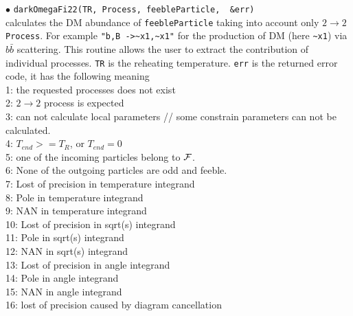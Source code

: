 \documentclass[12pt,a4paper]{article}
\begin{document}
\noindent
$\bullet$ \verb|darkOmegaFi22(TR, Process, feebleParticle,  &err)|  \\
calculates the  DM abundance of {\tt feebleParticle}  taking into account only  $2\to2$ {\tt Process}. For example \verb|"b,B ->~x1,~x1"|  for the production of DM (here \verb|~x1|) via $b\bar{b}$ scattering. This routine allows the user to extract the contribution of individual processes. \verb|TR| is the  reheating temperature. 
{\tt err} is the  returned error code, it has the following meaning\\
1: the requested processes does not exist\\
2: $2\rightarrow 2$ process is expected\\
3: can not calculate local parameters  // some constrain parameters can not be calculated.\\
4: $T_{end}>=T_R$, or $T_{end}=0$ \\
5: one of the incoming particles belong to ${\cal F}$.\\
6: None of the outgoing particles are odd  and feeble.\\
 7: Lost of precision in  temperature integrand\\
 8: Pole in temperature integrand\\
 9: NAN in temperature integrand\\
10: Lost of precision in  sqrt(s) integrand\\
11: Pole in sqrt(s) integrand\\
12: NAN  in sqrt(s) integrand\\
13: Lost of precision in angle integrand\\
14: Pole in angle  integrand\\
15: NAN  in angle  integrand\\
16: lost of precision caused by diagram cancellation\\
\end{document}
